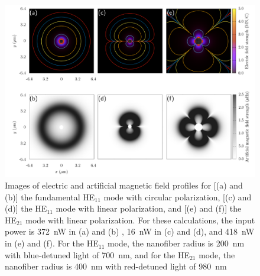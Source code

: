 \begin{figure}[tb]
 \includegraphics[width=\linewidth]{data/3d/all_fields.pdf}
         \caption{Images of electric and artificial magnetic field profiles for [(a) and (b)] the fundamental HE$_{11}$ mode with circular polarization, [(c) and (d)] the HE$_{11}$ mode with linear polarization, and [(e) and (f)] the HE$_{21}$ mode with linear polarization. For these calculations, the input power is 372~nW in (a) and (b) , 16~nW in (c) and (d), and 418~nW in (e) and (f). For the HE$_{11}$ mode, the nanofiber radius is 200~nm with blue-detuned light of 700~nm, and for the HE$_{21}$ mode, the nanofiber radius is 400~nm with red-detuned light of 980~nm}
 \label{fig:EtoB}
\end{figure}


